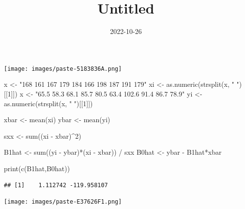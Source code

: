 \documentclass[
]{article}
\title{Untitled}
\author{}
\date{\vspace{-2.5em}2022-10-26}
\newenvironment{Shaded}{\begin{snugshade}}{\end{snugshade}}
\newcommand{\DecValTok}[1]{\textcolor[rgb]{0.00,0.00,0.81}{#1}}
\newcommand{\FunctionTok}[1]{\textcolor[rgb]{0.00,0.00,0.00}{#1}}
\newcommand{\NormalTok}[1]{#1}
\newcommand{\OtherTok}[1]{\textcolor[rgb]{0.56,0.35,0.01}{#1}}
\newcommand{\SpecialCharTok}[1]{\textcolor[rgb]{0.00,0.00,0.00}{#1}}
\newcommand{\StringTok}[1]{\textcolor[rgb]{0.31,0.60,0.02}{#1}}
\begin{document}
\maketitle

\texttt{[image: images/paste-5183836A.png]}

\begin{Shaded}
\begin{Highlighting}[]
\NormalTok{x }\OtherTok{\textless{}{-}} \StringTok{"168 161 167 179 184 166 198 187 191 179"}
\NormalTok{xi }\OtherTok{\textless{}{-}} \FunctionTok{as.numeric}\NormalTok{(}\FunctionTok{strsplit}\NormalTok{(x, }\StringTok{" "}\NormalTok{)[[}\DecValTok{1}\NormalTok{]])}
\NormalTok{x }\OtherTok{\textless{}{-}} \StringTok{"65.5 58.3 68.1 85.7 80.5 63.4 102.6 91.4 86.7 78.9"}
\NormalTok{yi }\OtherTok{\textless{}{-}} \FunctionTok{as.numeric}\NormalTok{(}\FunctionTok{strsplit}\NormalTok{(x, }\StringTok{" "}\NormalTok{)[[}\DecValTok{1}\NormalTok{]])}

\NormalTok{xbar }\OtherTok{\textless{}{-}} \FunctionTok{mean}\NormalTok{(xi)}
\NormalTok{ybar }\OtherTok{\textless{}{-}} \FunctionTok{mean}\NormalTok{(yi)}

\NormalTok{sxx }\OtherTok{\textless{}{-}} \FunctionTok{sum}\NormalTok{((xi }\SpecialCharTok{{-}}\NormalTok{ xbar)}\SpecialCharTok{\^{}}\DecValTok{2}\NormalTok{)}

\NormalTok{B1hat }\OtherTok{\textless{}{-}} \FunctionTok{sum}\NormalTok{((yi }\SpecialCharTok{{-}}\NormalTok{ ybar)}\SpecialCharTok{*}\NormalTok{(xi }\SpecialCharTok{{-}}\NormalTok{ xbar)) }\SpecialCharTok{/}\NormalTok{ sxx}
\NormalTok{B0hat }\OtherTok{\textless{}{-}}\NormalTok{ ybar }\SpecialCharTok{{-}}\NormalTok{ B1hat}\SpecialCharTok{*}\NormalTok{xbar}

\FunctionTok{print}\NormalTok{(}\FunctionTok{c}\NormalTok{(B1hat,B0hat))}
\end{Highlighting}
\end{Shaded}

\begin{verbatim}
## [1]    1.112742 -119.958107
\end{verbatim}

\texttt{[image: images/paste-E37626F1.png]}
\end{document}
